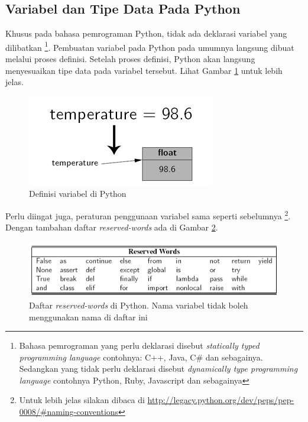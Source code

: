 \subsection{Variabel dan Tipe Data Pada Python}
Khusus pada bahasa pemrograman Python, tidak ada deklarasi variabel yang dilibatkan \footnote{Bahasa pemrograman yang perlu deklarasi disebut \textit{statically typed programming language} contohnya: C++, Java, C\# dan sebagainya. Sedangkan yang tidak perlu deklarasi disebut \textit{dynamically type programming language} contohnya Python, Ruby, Javascript dan sebagainya}. Pembuatan variabel pada Python pada umumnya langsung dibuat melalui proses definisi. Setelah proses definisi, Python akan langsung menyesuaikan tipe data pada variabel tersebut. Lihat Gambar \ref{fig:definisiVar} untuk lebih jelas. 
	\begin{figure}
		\centering
		\includegraphics[scale=0.75]{fig/1/definisiVar.png}
		\caption{Definisi variabel di Python}
		\label{fig:definisiVar}
	\end{figure}

Perlu diingat juga, peraturan penggunaan variabel sama seperti sebelumnya \footnote{Untuk lebih jelas silakan dibaca di \url{http://legacy.python.org/dev/peps/pep-0008/\#naming-conventions}}. Dengan tambahan daftar \textit{reserved-words} ada di Gambar \ref{fig:reservedWords}.
		\begin{figure}
		\centering
		\includegraphics[scale=0.4]{fig/1/Gambar17.png}
		\caption{Daftar \textit{reserved-words} di Python. Nama variabel tidak boleh menggunakan nama di daftar ini}
		\label{fig:reservedWords}
		\end{figure}


